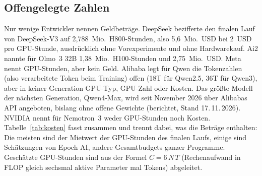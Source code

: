 \documentclass[a4paper,11pt]{article}
\begin{document}
\subsection{Offengelegte Zahlen}

Nur wenige Entwickler nennen Geldbeträge. DeepSeek bezifferte den
finalen Lauf von DeepSeek-V3 auf 2,788~Mio.\ H800-Stunden, also
5,6~Mio.\ USD bei 2~USD pro GPU-Stunde, ausdrücklich ohne
Vorexperimente und ohne Hardwarekauf. Ai2 nannte für Olmo~3 32B
1,38~Mio.\ H100-Stunden und 2,75~Mio.\ USD. Meta nennt GPU-Stunden,
aber kein Geld. Alibaba legt für Qwen die Tokenzahlen (also
verarbeitete Token beim Training) offen (18T für Qwen2.5, 36T für
Qwen3), aber in keiner Generation GPU-Typ, GPU-Zahl oder
Kosten.  Das größte Modell der nächsten Generation, Qwen4-Max, wird
seit November 2026 über Alibabas API angeboten, bislang ohne offene
Gewichte (berichtet, Stand 17.\,11.\,2026).  NVIDIA nennt für
Nemotron~3 weder GPU-Stunden noch
Kosten. Tabelle~\ref{tab:kosten} fasst zusammen und trennt dabei, was
die Beträge enthalten: Die meisten sind der Mietwert der GPU-Stunden
des finalen Laufs, einige sind Schätzungen von Epoch AI, andere
Gesamtbudgets ganzer Programme. Geschätzte GPU-Stunden sind aus der
Formel $C = 6\,N\,T$ (Rechenaufwand in FLOP gleich sechsmal aktive
Parameter mal Tokens) abgeleitet.
\end{document}
